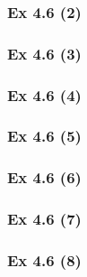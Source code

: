 \subsubsection{Ex 4.6 (2)}\label{sec:Ex_4.6.2}

\subsubsection{Ex 4.6 (3)}\label{sec:Ex_4.6.3}

\subsubsection{Ex 4.6 (4)}\label{sec:Ex_4.6.4}

\subsubsection{Ex 4.6 (5)}\label{sec:Ex_4.6.5}

\subsubsection{Ex 4.6 (6)}\label{sec:Ex_4.6.6}

\subsubsection{Ex 4.6 (7)}\label{sec:Ex_4.6.7}

\subsubsection{Ex 4.6 (8)}\label{sec:Ex_4.6.8}
